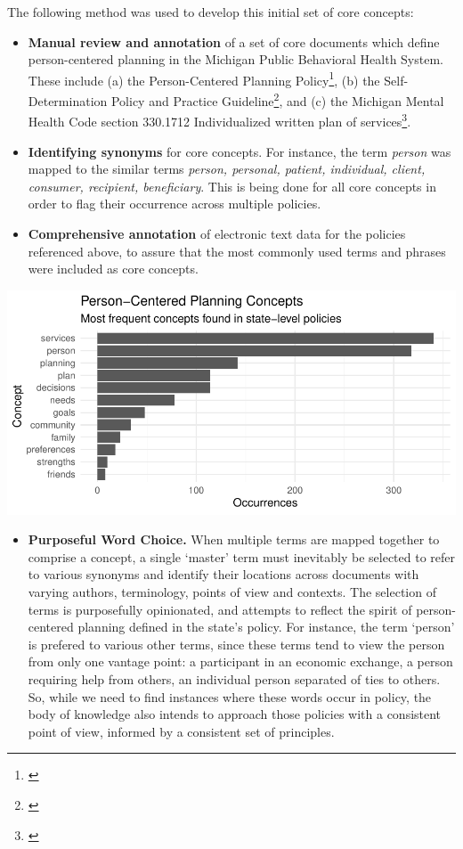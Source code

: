 \documentclass[
]{book}
\providecommand{\tightlist}{%
  \setlength{\itemsep}{0pt}\setlength{\parskip}{0pt}}
\begin{document}
The following method was used to develop this initial set of core concepts:

\begin{itemize}
\tightlist
\item
  \textbf{Manual review and annotation} of a set of core documents which define person-centered planning in the Michigan Public Behavioral Health System. These include (a) the Person-Centered Planning Policy\footnote{\citet{pcp-policy}}, (b) the Self-Determination Policy and Practice Guideline\footnote{\citet{sd-policy}}, and (c) the Michigan Mental Health Code section 330.1712 Individualized written plan of services\footnote{\citet{mi-mhc}}.
\item
  \textbf{Identifying synonyms} for core concepts. For instance, the term \emph{person} was mapped to the similar terms \emph{person, personal, patient, individual, client, consumer, recipient, beneficiary}. This is being done for all core concepts in order to flag their occurrence across multiple policies.
\item
  \textbf{Comprehensive annotation} of electronic text data for the policies referenced above, to assure that the most commonly used terms and phrases were included as core concepts.
\end{itemize}

\includegraphics{person_centered_files/figure-latex/plot_concept-1.pdf}

\begin{itemize}
\tightlist
\item
  \textbf{Purposeful Word Choice.} When multiple terms are mapped together to comprise a concept, a single `master' term must inevitably be selected to refer to various synonyms and identify their locations across documents with varying authors, terminology, points of view and contexts. The selection of terms is purposefully opinionated, and attempts to reflect the spirit of person-centered planning defined in the state's policy. For instance, the term `person' is prefered to various other terms, since these terms tend to view the person from only one vantage point: a participant in an economic exchange, a person requiring help from others, an individual person separated of ties to others. So, while we need to find instances where these words occur in policy, the body of knowledge also intends to approach those policies with a consistent point of view, informed by a consistent set of principles.
\end{itemize}
\end{document}
